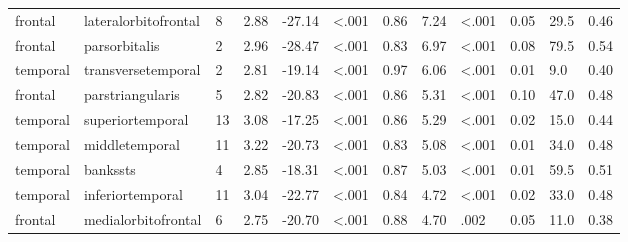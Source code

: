\documentclass{article}
\begin{document}
\begin{longtable}{llR{1.5cm}R{1cm}R{1.3cm}R{1cm}R{1cm}R{1.3cm}R{1cm}R{1.8cm}R{1.3cm}R{1.8cm}}
\bottomrule
\endlastfoot
   frontal &      lateralorbitofrontal &            8 &                  2.88 &           -27.14 &      \textless.001 &                               0.86 &                          7.24 &                   \textless.001 &  0.05 &   29.5 &      0.46 \\
   frontal &             parsorbitalis &            2 &                  2.96 &           -28.47 &      \textless.001 &                               0.83 &                          6.97 &                   \textless.001 &  0.08 &   79.5 &      0.54 \\
  temporal &        transversetemporal &            2 &                  2.81 &           -19.14 &      \textless.001 &                               0.97 &                          6.06 &                   \textless.001 &  0.01 &    9.0 &      0.40 \\
   frontal &          parstriangularis &            5 &                  2.82 &           -20.83 &      \textless.001 &                               0.86 &                          5.31 &                   \textless.001 &  0.10 &   47.0 &      0.48 \\
  temporal &          superiortemporal &           13 &                  3.08 &           -17.25 &      \textless.001 &                               0.86 &                          5.29 &                   \textless.001 &  0.02 &   15.0 &      0.44 \\
  temporal &            middletemporal &           11 &                  3.22 &           -20.73 &      \textless.001 &                               0.83 &                          5.08 &                   \textless.001 &  0.01 &   34.0 &      0.48 \\
  temporal &                  bankssts &            4 &                  2.85 &           -18.31 &      \textless.001 &                               0.87 &                          5.03 &                   \textless.001 &  0.01 &   59.5 &      0.51 \\
  temporal &          inferiortemporal &           11 &                  3.04 &           -22.77 &      \textless.001 &                               0.84 &                          4.72 &                   \textless.001 &  0.02 &   33.0 &      0.48 \\
   frontal &       medialorbitofrontal &            6 &                  2.75 &           -20.70 &      \textless.001 &                               0.88 &                          4.70 &                            .002 &  0.05 &   11.0 &      0.38 \\

\end{longtable}
\end{document}
